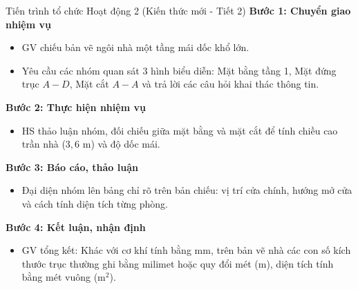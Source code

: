\documentclass[12pt, a4paper]{article}
\begin{document}
\begin{pedabox}{Tiến trình tổ chức Hoạt động 2 (Kiến thức mới - Tiết 2)}
    \textbf{Bước 1: Chuyển giao nhiệm vụ}
    \begin{itemize}[leftmargin=0.6cm]
        \item GV chiếu bản vẽ ngôi nhà một tầng mái dốc khổ lớn.
        \item Yêu cầu các nhóm quan sát 3 hình biểu diễn: Mặt bằng tầng 1, Mặt đứng trục $A-D$, Mặt cắt $A-A$ và trả lời các câu hỏi khai thác thông tin.
    \end{itemize}

    \textbf{Bước 2: Thực hiện nhiệm vụ}
    \begin{itemize}[leftmargin=0.6cm]
        \item HS thảo luận nhóm, đối chiếu giữa mặt bằng và mặt cắt để tính chiều cao trần nhà ($3{,}6\text{ m}$) và độ dốc mái.
    \end{itemize}

    \textbf{Bước 3: Báo cáo, thảo luận}
    \begin{itemize}[leftmargin=0.6cm]
        \item Đại diện nhóm lên bảng chỉ rõ trên bản chiếu: vị trí cửa chính, hướng mở cửa và cách tính diện tích từng phòng.
    \end{itemize}

    \textbf{Bước 4: Kết luận, nhận định}
    \begin{itemize}[leftmargin=0.6cm]
        \item GV tổng kết: Khác với cơ khí tính bằng $\text{mm}$, trên bản vẽ nhà các con số kích thước trục thường ghi bằng milimet hoặc quy đổi mét ($\text{m}$), diện tích tính bằng mét vuông ($\text{m}^2$).
    \end{itemize}
\end{pedabox}
\end{document}
